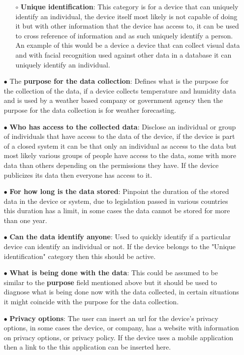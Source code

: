 \begin{itemize}
\begin{itemize}
        \item[$\circ$] \textbf{Unique identification}: This category is for a device that can uniquely identify an individual, the device itself most likely is not capable of doing it but with other information that the device has access to, it can be used to cross reference of information and as such uniquely identify a person. An example of this would be a device a device that can collect visual data and with facial recognition used against other data in a database it can uniquely identify an individual.
    \end{itemize}
    \item[$\bullet$]
    The \textbf{purpose for the data collection}: Defines what is the purpose for the collection of the data, if a device collects temperature and humidity data and is used by a weather based company or government agency then the purpose for the data collection is for weather forecasting.
    \item[$\bullet$]
    \textbf{Who has access to the collected data}: Disclose an individual or group of individuals that have access to the data of the device, if the device is part of a closed system it can be that only an individual as access to the data but most likely various groups of people have access to the data, some with more data than others depending on the permissions they have. If the device publicizes its data then everyone has access to it.
    \item[$\bullet$]
    \textbf{For how long is the data stored}: Pinpoint the duration of the stored data in the device or system, due to legislation passed in various countries this duration has a limit, in some cases the data cannot be stored for more than one year.
    \item[$\bullet$]
    \textbf{Can the data identify anyone}: Used to quickly identify if a particular device can identify an individual or not. If the device belongs to the "Unique identification" category then this should be active.
    \item[$\bullet$]
    \textbf{What is being done with the data}: This could be assumed to be similar to the \textbf{purpose} field mentioned above but it should be used to diagnose what is being done now with the data collected, in certain situations it might coincide with the purpose for the data collection.
    \item[$\bullet$]
    \textbf{Privacy options}: The user can insert an url for the device's privacy options, in some cases the device, or company, has a website with information on privacy options, or privacy policy. If the device uses a mobile application then a link to the this application can be inserted here.

\end{itemize}
